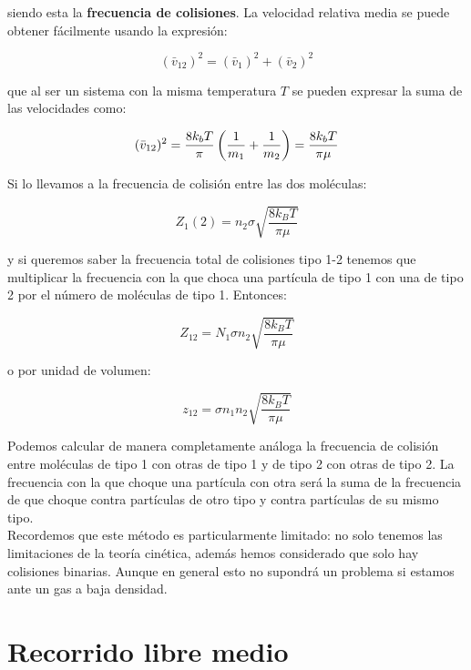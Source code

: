 \documentclass[12pt]{book}
\begin{document}
siendo esta la \textbf{frecuencia de colisiones}. La velocidad relativa media se puede obtener fácilmente usando la expresión:

\begin{equation}
(\bar{v}_{12})^2 = (\bar{v}_1)^2 + (\bar{v}_2)^2
\end{equation}

que al ser un sistema con la misma temperatura $T$ se pueden expresar la suma de las velocidades como:

\begin{equation}
(\bar{v}_{12})^2 = \dfrac{8 k_b T}{\pi} \left( \frac{1}{m_1} + \frac{1}{m_2} \right) = \dfrac{8 k_b T}{\pi \mu} 
\end{equation}

Si lo llevamos a la frecuencia de colisión entre las dos moléculas:

\begin{equation}
Z_1 (2) = n_2 \sigma \sqrt{\frac{8 k_B T}{\pi \mu}}
\end{equation}

y si queremos saber la frecuencia total de colisiones tipo 1-2 tenemos que multiplicar la frecuencia con la que choca una partícula de tipo 1 con una de tipo 2 por el número de moléculas de tipo 1. Entonces:

\begin{equation}
Z_{12} = N_1 \sigma n_2  \sqrt{\frac{8 k_B T}{\pi \mu}}
\end{equation}

o por unidad de volumen:

\begin{equation}
z_{12} = \sigma n_1 n_2  \sqrt{\frac{8 k_B T}{\pi \mu}}
\end{equation}

Podemos calcular de manera completamente análoga la frecuencia de colisión entre moléculas de tipo 1 con otras de tipo 1 y de tipo 2 con otras de tipo 2. La frecuencia con la que choque una partícula con otra será la suma de la frecuencia de que choque contra partículas de otro tipo y contra partículas de su mismo tipo. \\

Recordemos que este método es particularmente limitado: no solo tenemos las limitaciones de la teoría cinética, además hemos considerado que solo hay colisiones binarias. Aunque en general esto no supondrá un problema si estamos ante un gas a baja densidad. 

\section{Recorrido libre medio}
\end{document}
